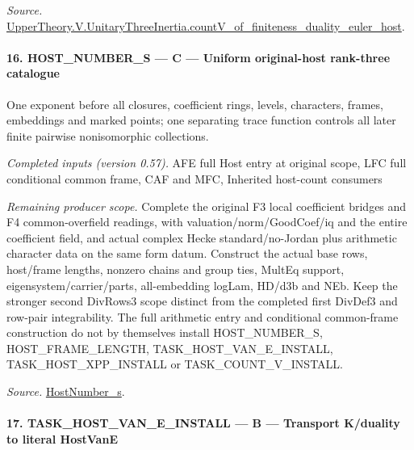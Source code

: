 \emph{Source.} \href{https://github.com/CocoSgt/riemann-hypothesis-lean/blob/7cbf7a0c32fca1badf05931879a37c3f8a2b03b4/src/Development/AutomorphicArithmetic/AutomorphicVarieties/ModularityArgument/ThresholdArguments/DenseThresholdCases/CountVOf.lean#L33-L60}{UpperTheory.V.UnitaryThreeInertia.countV\_\allowbreak of\_\allowbreak finiteness\_\allowbreak duality\_\allowbreak euler\_\allowbreak host}.



\paragraph{16. HOST\_\allowbreak NUMBER\_\allowbreak S — C — Uniform original-host rank-three catalogue}

One exponent before all closures, coefficient rings, levels, characters, frames, embeddings and marked points; one separating trace function controls all later finite pairwise nonisomorphic collections.

\emph{Completed inputs (version 0.57).} AFE full Host entry at original scope, LFC full conditional common frame, CAF and MFC, Inherited host-count consumers

\emph{Remaining producer scope.} Complete the original F3 local coefficient bridges and F4 common-overfield readings, with valuation/norm/GoodCoef/iq and the entire coefficient field, and actual complex Hecke standard/no-Jordan plus arithmetic character data on the same form datum. Construct the actual base rows, host/frame lengths, nonzero chains and group ties, MultEq support, eigensystem/carrier/parts, all-embedding logLam, HD/d3b and NEb. Keep the stronger second DivRows3 scope distinct from the completed first DivDef3 and row-pair integrability. The full arithmetic entry and conditional common-frame construction do not by themselves install HOST\_\allowbreak NUMBER\_\allowbreak S, HOST\_\allowbreak FRAME\_\allowbreak LENGTH, TASK\_\allowbreak HOST\_\allowbreak VAN\_\allowbreak E\_\allowbreak INSTALL, TASK\_\allowbreak HOST\_\allowbreak XPP\_\allowbreak INSTALL or TASK\_\allowbreak COUNT\_\allowbreak V\_\allowbreak INSTALL.

\emph{Source.} \href{https://github.com/CocoSgt/riemann-hypothesis-lean/blob/7cbf7a0c32fca1badf05931879a37c3f8a2b03b4/src/Development/AutomorphicArithmetic/AutomorphicVarieties/ModularityArgument/ThresholdArguments/DenseThresholdCases/HostNumberS.lean#L18-L28}{HostNumber\_\allowbreak s}.



\paragraph{17. TASK\_\allowbreak HOST\_\allowbreak VAN\_\allowbreak E\_\allowbreak INSTALL — B — Transport K/duality to literal HostVanE}

